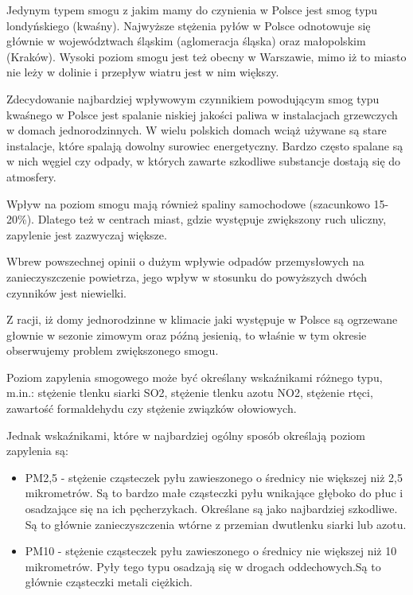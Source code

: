 \documentclass[a4paper,12pt,twoside,openany]{report}
\begin{document}
Jedynym typem smogu z jakim mamy do czynienia w Polsce jest smog typu londyńskiego (kwaśny). Najwyższe stężenia pyłów w Polsce odnotowuje się głównie w województwach śląskim (aglomeracja śląska) oraz małopolskim (Kraków). Wysoki poziom smogu jest też obecny w Warszawie, mimo iż to miasto nie leży w dolinie i przepływ wiatru jest w nim większy.

Zdecydowanie najbardziej wpływowym czynnikiem powodującym smog typu kwaśnego w Polsce jest spalanie niskiej jakości paliwa w instalacjach grzewczych w domach jednorodzinnych. W wielu polskich domach wciąż używane są stare instalacje, które spalają dowolny surowiec energetyczny. Bardzo często spalane są w nich węgiel czy odpady, w których zawarte szkodliwe substancje dostają się do atmosfery.

Wpływ na poziom smogu mają również spaliny samochodowe (szacunkowo 15-20\%).
Dlatego też w centrach miast, gdzie występuje zwiększony ruch uliczny, zapylenie jest zazwyczaj większe.

Wbrew powszechnej opinii o dużym wpływie odpadów przemysłowych na zanieczyszczenie powietrza, jego wpływ w stosunku do powyższych dwóch czynników jest niewielki.

Z racji, iż domy jednorodzinne w klimacie jaki występuje w Polsce są ogrzewane głownie w sezonie zimowym oraz późną jesienią, to właśnie w tym okresie obserwujemy problem zwiększonego smogu.

Poziom zapylenia smogowego może być określany wskaźnikami różnego typu, m.in.: stężenie tlenku siarki SO2, stężenie tlenku azotu NO2, stężenie rtęci, zawartość formaldehydu czy stężenie związków ołowiowych.

Jednak wskaźnikami, które w najbardziej ogólny sposób określają poziom zapylenia są:

\begin{itemize}
	\item PM2,5 - stężenie cząsteczek pyłu zawieszonego o średnicy nie większej niż 2,5 mikrometrów. Są to bardzo małe cząsteczki pyłu wnikające głęboko do płuc i osadzające się na ich pęcherzykach. Określane są jako najbardziej szkodliwe. Są to głównie zanieczyszczenia wtórne z przemian dwutlenku siarki lub azotu.
	
	\item PM10 - stężenie cząsteczek pyłu zawieszonego o średnicy nie większej niż 10 mikrometrów. Pyły tego typu  osadzają się w drogach oddechowych.Są to głównie cząsteczki metali ciężkich.
\end{itemize}
\end{document}
